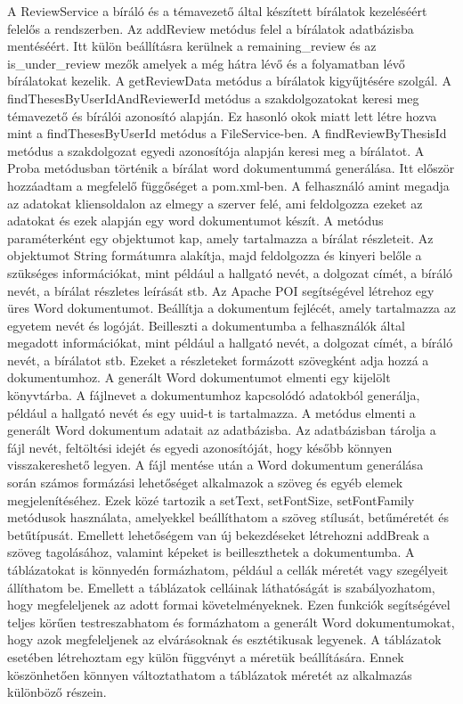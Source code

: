 A ReviewService a bíráló és a témavezető által készített bírálatok kezeléséért felelős a rendszerben. Az addReview metódus felel a bírálatok adatbázisba mentéséért. Itt külön beállításra kerülnek a remaining\_review és az is\_under\_review mezők amelyek a még hátra lévő és a folyamatban lévő bírálatokat kezelik. A getReviewData metódus a bírálatok kigyűjtésére szolgál. A findThesesByUserIdAndReviewerId metódus a szakdolgozatokat keresi meg témavezető és bírálói azonosító alapján. Ez hasonló okok miatt lett létre hozva mint a findThesesByUserId metódus a FileService-ben. A findReviewByThesisId metódus a szakdolgozat egyedi azonosítója alapján keresi meg a bírálatot. A Proba metódusban történik a bírálat word dokumentummá generálása. Itt először hozzáadtam a megfelelő függőséget a pom.xml-ben. A felhasználó amint megadja az adatokat kliensoldalon az elmegy a szerver felé, ami feldolgozza ezeket az adatokat és ezek alapján egy word dokumentumot készít. A metódus paraméterként egy objektumot kap, amely tartalmazza a bírálat részleteit. Az objektumot String formátumra alakítja, majd feldolgozza és kinyeri belőle a szükséges információkat, mint például a hallgató nevét, a dolgozat címét, a bíráló nevét, a bírálat részletes leírását stb. Az Apache POI segítségével létrehoz egy üres Word dokumentumot.
Beállítja a dokumentum fejlécét, amely tartalmazza az egyetem nevét és logóját. Beilleszti a dokumentumba a felhasználók által megadott információkat, mint például a hallgató nevét, a dolgozat címét, a bíráló nevét, a bírálatot stb. Ezeket a részleteket formázott szövegként adja hozzá a dokumentumhoz. A generált Word dokumentumot elmenti egy kijelölt könyvtárba. A fájlnevet a dokumentumhoz kapcsolódó adatokból generálja, például a hallgató nevét és egy uuid-t is tartalmazza. A metódus elmenti a generált Word dokumentum adatait az adatbázisba. Az adatbázisban tárolja a fájl nevét, feltöltési idejét és egyedi azonosítóját, hogy később könnyen visszakereshető legyen. A fájl mentése után a Word dokumentum generálása során számos formázási lehetőséget alkalmazok a szöveg és egyéb elemek megjelenítéséhez. Ezek közé tartozik a setText, setFontSize, setFontFamily metódusok használata, amelyekkel beállíthatom a szöveg stílusát, betűméretét és betűtípusát. Emellett lehetőségem van új bekezdéseket létrehozni addBreak a szöveg tagolásához, valamint képeket is beilleszthetek a dokumentumba. A táblázatokat is könnyedén formázhatom, például a cellák méretét vagy szegélyeit állíthatom be. Emellett a táblázatok celláinak láthatóságát is szabályozhatom, hogy megfeleljenek az adott formai követelményeknek. Ezen funkciók segítségével teljes körűen testreszabhatom és formázhatom a generált Word dokumentumokat, hogy azok megfeleljenek az elvárásoknak és esztétikusak legyenek. A táblázatok esetében létrehoztam egy külön függvényt a méretük beállítására. Ennek köszönhetően könnyen változtathatom a táblázatok méretét az alkalmazás különböző részein.

